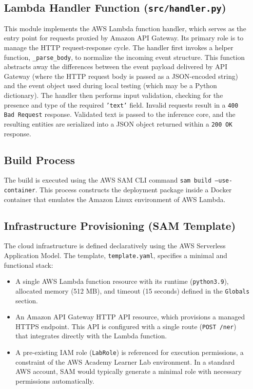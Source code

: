 \documentclass[11pt,a4paper]{article}
\begin{document}
\subsection{Lambda Handler Function (\texttt{src/handler.py})}
This module implements the AWS Lambda function handler, which serves as the entry point for requests proxied by Amazon API Gateway. Its primary role is to manage the HTTP request-response cycle. The handler first invokes a helper function, \texttt{\_parse\_body}, to normalize the incoming event structure. This function abstracts away the differences between the event payload delivered by API Gateway (where the HTTP request body is passed as a JSON-encoded string) and the event object used during local testing (which may be a Python dictionary). The handler then performs input validation, checking for the presence and type of the required \texttt{'text'} field. Invalid requests result in a \texttt{400 Bad Request} response. Validated text is passed to the inference core, and the resulting entities are serialized into a JSON object returned within a \texttt{200 OK} response.

\subsection{Build Process}
The build is executed using the AWS SAM CLI command \texttt{sam build --use-container}. This process constructs the deployment package inside a Docker container that emulates the Amazon Linux environment of AWS Lambda.

\subsection{Infrastructure Provisioning (SAM Template)}
The cloud infrastructure is defined declaratively using the AWS Serverless Application Model. The template, \texttt{template.yaml}, specifies a minimal and functional stack:
\begin{itemize}
    \item A single AWS Lambda function resource with its runtime (\texttt{python3.9}), allocated memory (512 MB), and timeout (15 seconds) defined in the \texttt{Globals} section.
    \item An Amazon API Gateway HTTP API resource, which provisions a managed HTTPS endpoint. This API is configured with a single route (\texttt{POST /ner}) that integrates directly with the Lambda function.
    \item A pre-existing IAM role (\texttt{LabRole}) is referenced for execution permissions, a constraint of the AWS Academy Learner Lab environment. In a standard AWS account, SAM would typically generate a minimal role with necessary permissions automatically.
\end{itemize}
\end{document}
